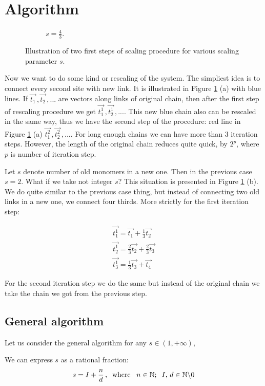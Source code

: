 \documentclass[12pt]{article}
\newcommand{\enterProblemHeader}[1]{
\nobreak\extramarks{#1}{}\nobreak
}
\newcommand{\exitProblemHeader}[1]{
}
\newcounter{homeworkProblemCounter} %
\newcommand{\homeworkProblemName}{}
\newenvironment{homeworkProblem}[1][Problem \arabic{homeworkProblemCounter}]{ %
\stepcounter{homeworkProblemCounter} %
\renewcommand{\homeworkProblemName}{#1} %
\section{\homeworkProblemName} %
\setlength\parindent{18pt}
\enterProblemHeader{\homeworkProblemName} %
}{
}
\begin{document}
\begin{homeworkProblem}[Algorithm]
\begin{figure}
\begin{subfigure}{0.45\linewidth}
  		\caption{$s = \frac{4}{3}$.}
  	\end{subfigure}
  	\caption{Illustration of two first steps of scaling procedure for various scaling parameter $s$. }
	\label{fig:theoreticalScaling}
\end{figure}
Now we want to do some kind or rescaling of the system. The simpliest idea is to connect every second site with new link. It is illustrated in Figure \ref{fig:theoreticalScaling} (a) with blue lines.
If $\vec{t_1}\,,\vec{t_2}\,,...$ are vectors along links of original chain, then after the first step of rescaling procedure we get $\vec{t_1^1}\,,\vec{t_2^1}\,,...$. This new blue chain also can be rescaled in the same way, thus we have the second step of the procedure: red line in Figure \ref{fig:theoreticalScaling} (a) $\vec{t_1^2}\,,\vec{t_2^2}\,,...$. For long enough chains we can have more than 3 iteration steps. However, the length of the original chain reduces quite quick, by $2^p$, where $p$ is number of iteration step.

Let $s$ denote number of old monomers in a new one. Then  in the previous case $s=2$. What if we take not integer $s$? This situation is presented in Figure \ref{fig:theoreticalScaling} (b). We do quite similar to the previous case thing, but instead of connecting two old links in a new one, we connect four thirds. More strictly for the first iteration step:

\begin{gather*}
\vec{t_1^1} = \vec{t_1} + \frac{1}{3}\vec{t_2}\\
\vec{t_2^1} = \frac{2}{3}\vec{t_2} + \frac{2}{3}\vec{t_3}\\
\vec{t_3^1} = \frac{1}{3}\vec{t_3} + \vec{t_4}
\end{gather*}

For the second iteration step we do the same but instead of the original chain we take the chain we got from the previous step.

\subsection{General algorithm}
Let us consider the general algorithm for any $s\in(1,+\infty)$, 

We can express $s$ as a rational fraction:
\begin{equation}
s = I+\frac{n}{d}\,,\;\;{\rm where}\;\;\; n\in \mathbb{N};\;\;I,\,d \in \mathbb{N}\backslash 0
\label{eq:s}
\end{equation}


\end{homeworkProblem}
\end{document}

